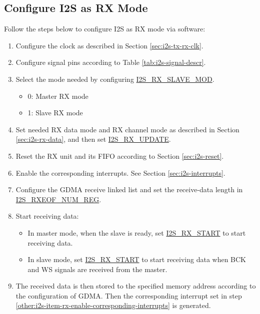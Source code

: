 \documentclass[main\_\_EN.tex]{subfiles}
\begin{document}
\subsection{Configure I2S as RX Mode}\label{sec:i2s-configure-i2s-rx-mode}

Follow the steps below to configure I2S as RX mode via software:

\begin{enumerate}
    \item Configure the clock as described in Section \ref{sec:i2s-tx-rx-clk}.
    \item Configure signal pins according to Table \ref{tab:i2s-signal-descr}.
    \item Select the mode needed by configuring \hyperref[fielddesc:I2SRXSLAVEMOD]{I2S\_RX\_SLAVE\_MOD}.
    \begin{itemize}
        \item 0: Master RX mode
        \item 1: Slave RX mode
    \end{itemize}
    \item Set needed RX data mode and RX channel mode as described in Section \ref{sec:i2s-rx-data}, and then set \hyperref[fielddesc:I2SRXUPDATE]{I2S\_RX\_UPDATE}.
    \item Reset the RX unit and its FIFO according to Section \ref{sec:i2s-reset}.
    \item Enable the corresponding interrupts. See Section \ref{sec:i2s-interrupts}.\label{other:i2s-item-rx-enable-corresponding-interrupts}
    \item Configure the GDMA receive linked list and set the receive-data length in \hyperref[regdesc:I2SRXEOFNUMREG]{I2S\_RXEOF\_NUM\_REG}.
    \item Start receiving data:
    \begin{itemize}
        \item In master mode, when the slave is ready, set \hyperref[fielddesc:I2SRXSTART]{I2S\_RX\_START} to start receiving data.
        \item In slave mode, set  \hyperref[fielddesc:I2SRXSTART]{I2S\_RX\_START} to start receiving data when BCK and WS signals are received from the master.
    \end{itemize}
    \item The received data is then stored to the specified memory address according to the configuration of GDMA. Then the corresponding interrupt set in step \ref{other:i2s-item-rx-enable-corresponding-interrupts} is generated.
\end{enumerate}
\end{document}
